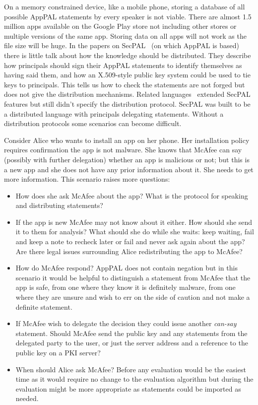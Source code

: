 \documentclass[a4paper]{scrartcl}
\begin{document}
On a memory constrained device, like a mobile phone, storing a database of all possible AppPAL statements by every speaker is not viable.
There are almost 1.5 million apps available on the Google Play store not including other stores or multiple versions of the same app.
Storing data on all apps will not work as the file size will be huge.
In the papers on SecPAL~\citep{Becker:2006vh,Becker:2009vt} (on which AppPAL is based) there is little talk about how the knowledge should be distributed.
They describe how principals should sign their AppPAL statements to identify themselves as having said them, and how an X.509-style public key system could be used to tie keys to principals.
This tells us how to check the statements are not forged but does not give the distribution mechanisms.
Related languages~\citep{Becker:2009ula,Aziz:2011vt,Gurevich:2008fz,Gurevich:Qo5E3M3} extended SecPAL features but still didn't specify the distribution protocol.
SecPAL was built to be a distributed language with principals delegating statements.
Without a distribution protocols some scenarios can become difficult.

Consider Alice who wants to install an app on her phone.
Her installation policy requires confirmation the app is not malware.
She knows that McAfee can say (possibly with further delegation) whether an app is malicious or not;
  but this is a new app and she does not have any prior information about it.
She needs to get more information.
This scenario raises more questions:

\begin{itemize}
  \item
    How does she ask McAfee about the app?
    What is the protocol for speaking and distributing statements?
  \item
    If the app is new McAfee may not know about it either.
    How should she send it to them for analysis?
    What should she do while she waits: keep waiting, fail and keep a note to recheck later or fail and never ask again about the app?
    Are there legal issues surrounding Alice redistributing the app to McAfee?
  \item
    How do McAfee respond?
    AppPAL does not contain negation but in this scenario it would be helpful to distinguish a statement from McAfee that the app is safe, from one where they know it is definitely malware, from one where they are unsure and wish to err on the side of caution and not make a definite statement.
  \item
    If McAfee wish to delegate the decision they could issue another \emph{can-say} statement.
    Should McAfee send the public key and any statements from the delegated party to the user, or just the server address and a reference to the public key on a PKI server?
  \item
    When should Alice ask McAfee?
    Before any evaluation would be the easiest time as it would require no change to the evaluation algorithm but during the evaluation might be more appropriate as statements could be imported as needed.
\end{itemize}
\end{document}
